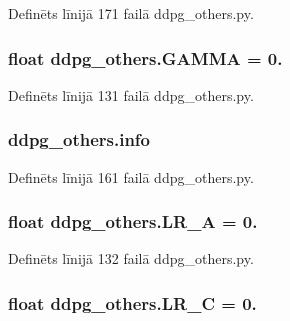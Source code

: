 Definēts līnijā 171 failā ddpg\+\_\+others.\+py.

\subsubsection[{\texorpdfstring{G\+A\+M\+MA}{GAMMA}}]{\setlength{\rightskip}{0pt plus 5cm}float ddpg\+\_\+others.\+G\+A\+M\+MA = 0.}\hypertarget{namespaceddpg__others_a38ab6c2b615e48356811e668c04931f5}{}\label{namespaceddpg__others_a38ab6c2b615e48356811e668c04931f5}


Definēts līnijā 131 failā ddpg\+\_\+others.\+py.

\subsubsection[{\texorpdfstring{info}{info}}]{\setlength{\rightskip}{0pt plus 5cm}ddpg\+\_\+others.\+info}\hypertarget{namespaceddpg__others_a906ea017b3e79f8b9791285c30773671}{}\label{namespaceddpg__others_a906ea017b3e79f8b9791285c30773671}


Definēts līnijā 161 failā ddpg\+\_\+others.\+py.

\subsubsection[{\texorpdfstring{L\+R\+\_\+A}{LR_A}}]{\setlength{\rightskip}{0pt plus 5cm}float ddpg\+\_\+others.\+L\+R\+\_\+A = 0.}\hypertarget{namespaceddpg__others_a414c179cc14428441e47d44afc4dd8f2}{}\label{namespaceddpg__others_a414c179cc14428441e47d44afc4dd8f2}


Definēts līnijā 132 failā ddpg\+\_\+others.\+py.

\subsubsection[{\texorpdfstring{L\+R\+\_\+C}{LR_C}}]{\setlength{\rightskip}{0pt plus 5cm}float ddpg\+\_\+others.\+L\+R\+\_\+C = 0.}\hypertarget{namespaceddpg__others_af9a7b0578b28ea38c337e8db55f0bb7e}{}\label{namespaceddpg__others_af9a7b0578b28ea38c337e8db55f0bb7e}


